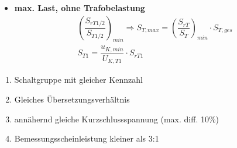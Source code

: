 \begin{itemize}
\item[]{\textbf{max. Last, ohne Trafobelastung}}
    \begin{gather*}
    \left(\dfrac{S_{rT1/2}}{S_{T1/2}}\right)_{min} \Rightarrow S_{T,max} = \left(\dfrac{S_{rT}}{S_T}\right)_{min} \cdot S_{T,ges}\\
    S_{T1} = \dfrac{u_{K,min}}{U_{K,T1}} \cdot S_{rT1}
    \end{gather*}
\end{itemize}

\begin{enumerate}
    \item Schaltgruppe mit gleicher Kennzahl
    \item Gleiches Übersetzungsverhältnis
    \item annähernd gleiche Kurzschlussspannung (max. diff. 10\%)
    \item Bemessungsscheinleistung kleiner als 3:1
\end{enumerate}
